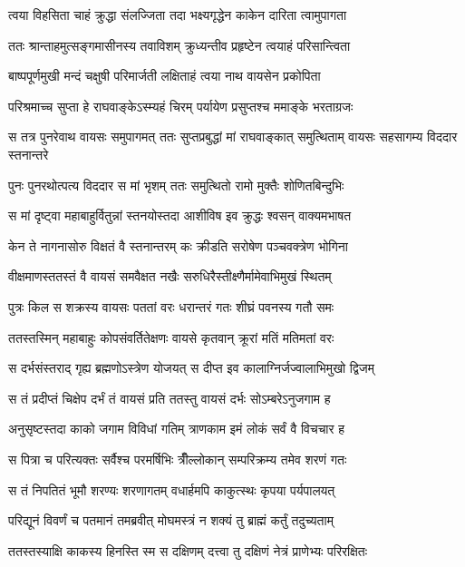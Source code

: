 \twolineshloka
{त्वया विहसिता चाहं क्रुद्धा संलज्जिता तदा}
{भक्ष्यगृद्धेन काकेन दारिता त्वामुपागता} %

\twolineshloka
{ततः श्रान्ताहमुत्सङ्गमासीनस्य तवाविशम्}
{क्रुध्यन्तीव प्रहृष्टेन त्वयाहं परिसान्त्विता} %

\twolineshloka
{बाष्पपूर्णमुखी मन्दं चक्षुषी परिमार्जती}
{लक्षिताहं त्वया नाथ वायसेन प्रकोपिता} %

\twolineshloka
{परिश्रमाच्च सुप्ता हे राघवाङ्केऽस्म्यहं चिरम्}
{पर्यायेण प्रसुप्तश्च ममाङ्के भरताग्रजः} %

\threelineshloka
{स तत्र पुनरेवाथ वायसः समुपागमत्}
{ततः सुप्तप्रबुद्धां मां राघवाङ्कात् समुत्थिताम्}
{वायसः सहसागम्य विददार स्तनान्तरे} %

\twolineshloka
{पुनः पुनरथोत्पत्य विददार स मां भृशम्}
{ततः समुत्थितो रामो मुक्तैः शोणितबिन्दुभिः} %

\twolineshloka
{स मां दृष्ट्वा महाबाहुर्वितुन्नां स्तनयोस्तदा}
{आशीविष इव क्रुद्धः श्वसन् वाक्यमभाषत} %

\twolineshloka
{केन ते नागनासोरु विक्षतं वै स्तनान्तरम्}
{कः क्रीडति सरोषेण पञ्चवक्त्रेण भोगिना} %

\twolineshloka
{वीक्षमाणस्ततस्तं वै वायसं समवैक्षत}
{नखैः सरुधिरैस्तीक्ष्णैर्मामेवाभिमुखं स्थितम्} %

\twolineshloka
{पुत्रः किल स शक्रस्य वायसः पततां वरः}
{धरान्तरं गतः शीघ्रं पवनस्य गतौ समः} %

\twolineshloka
{ततस्तस्मिन् महाबाहुः कोपसंवर्तितेक्षणः}
{वायसे कृतवान् क्रूरां मतिं मतिमतां वरः} %

\twolineshloka
{स दर्भसंस्तराद् गृह्य ब्रह्मणोऽस्त्रेण योजयत्}
{स दीप्त इव कालाग्निर्जज्वालाभिमुखो द्विजम्} %

\twolineshloka
{स तं प्रदीप्तं चिक्षेप दर्भं तं वायसं प्रति}
{ततस्तु वायसं दर्भः सोऽम्बरेऽनुजगाम ह} %

\twolineshloka
{अनुसृष्टस्तदा काको जगाम विविधां गतिम्}
{त्राणकाम इमं लोकं सर्वं वै विचचार ह} %

\twolineshloka
{स पित्रा च परित्यक्तः सर्वैश्च परमर्षिभिः}
{त्रीँल्लोकान् सम्परिक्रम्य तमेव शरणं गतः} %

\twolineshloka
{स तं निपतितं भूमौ शरण्यः शरणागतम्}
{वधार्हमपि काकुत्स्थः कृपया पर्यपालयत्} %

\twolineshloka
{परिद्यूनं विवर्णं च पतमानं तमब्रवीत्}
{मोघमस्त्रं न शक्यं तु ब्राह्मं कर्तुं तदुच्यताम्} %

\twolineshloka
{ततस्तस्याक्षि काकस्य हिनस्ति स्म स दक्षिणम्}
{दत्त्वा तु दक्षिणं नेत्रं प्राणेभ्यः परिरक्षितः} %

